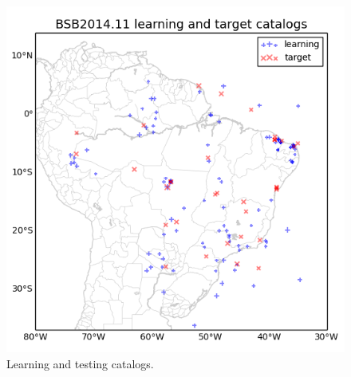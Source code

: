 \documentclass[grl]{agutex}
\begin{document}
\begin{figure}
	\includegraphics[width=0.99\linewidth]{z_img_helmstetter_catalogues}
	\caption{Learning and testing catalogs.}
	\label{fig_helmstetter_catalogues}
\end{figure}



\end{document}

